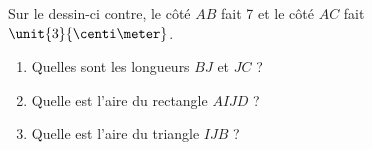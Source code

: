 
\begin{exercice}\label{exoSeconde-0096}

    \begin{multicols}{2}
        Sur le dessin-ci contre, le côté \( AB\) fait \unit{7}{\centi\meter} et le côté \( AC\) fait \( \unit{3}{\centi\meter}\). 
        \begin{enumerate}
            \item
                Quelles sont les longueurs \( BJ\) et \( JC\) ?
            \item
                Quelle est l'aire du rectangle \( AIJD\) ?
            \item
                Quelle est l'aire du triangle \( IJB\) ?
        \end{enumerate}
        
\columnbreak

\begin{center}

\end{center}

    \end{multicols}



\end{exercice}
